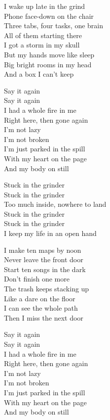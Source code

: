 \begin{lyrics}
I wake up late in the grind\\
Phone face-down on the chair\\
Three tabs, four tasks, one brain\\
All of them starting there\\
I got a storm in my skull\\
But my hands move like sleep\\
Big bright rooms in my head\\
And a box I can’t keep

Say it again\\
Say it again\\
I had a whole fire in me\\
Right here, then gone again\\
I’m not lazy\\
I’m not broken\\
I’m just parked in the spill\\
With my heart on the page\\
And my body on still

Stuck in the grinder\\
Stuck in the grinder\\
Too much inside, nowhere to land\\
Stuck in the grinder\\
Stuck in the grinder\\
I keep my life in an open hand

I make ten maps by noon\\
Never leave the front door\\
Start ten songs in the dark\\
Don’t finish one more\\
The trash keeps stacking up\\
Like a dare on the floor\\
I can see the whole path\\
Then I miss the next door

Say it again\\
Say it again\\
I had a whole fire in me\\
Right here, then gone again\\
I’m not lazy\\
I’m not broken\\
I’m just parked in the spill\\
With my heart on the page\\
And my body on still


\end{lyrics}
